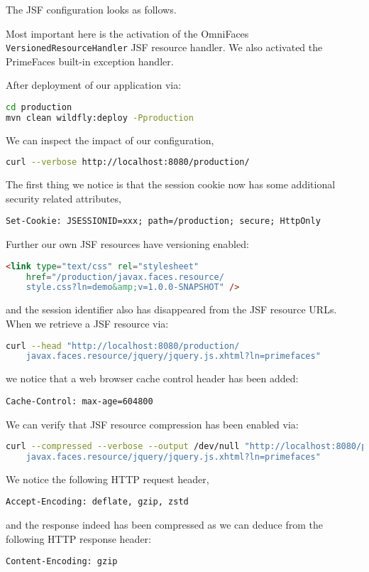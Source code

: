 The JSF configuration looks as follows.

Most important here is the activation of the OmniFaces \texttt{VersionedResourceHandler} JSF resource handler.
We also activated the PrimeFaces built-in exception handler.

After deployment of our application via:
\begin{lstlisting}[language=bash]
cd production
mvn clean wildfly:deploy -Pproduction
\end{lstlisting}
We can inspect the impact of our configuration,
\begin{lstlisting}[language=bash]
curl --verbose http://localhost:8080/production/
\end{lstlisting}
The first thing we notice is that the session cookie now has some additional security related attributes,
\begin{lstlisting}
Set-Cookie: JSESSIONID=xxx; path=/production; secure; HttpOnly
\end{lstlisting}
Further our own JSF resources have versioning enabled:
\begin{lstlisting}[language=html]
<link type="text/css" rel="stylesheet"
	href="/production/javax.faces.resource/
	style.css?ln=demo&amp;v=1.0.0-SNAPSHOT" />
\end{lstlisting}
and the session identifier also has disappeared from the JSF resource URLs.
When we retrieve a JSF resource via:
\begin{lstlisting}[language=bash]
curl --head "http://localhost:8080/production/
	javax.faces.resource/jquery/jquery.js.xhtml?ln=primefaces"
\end{lstlisting}
we notice that a web browser cache control header has been added:
\begin{lstlisting}
Cache-Control: max-age=604800
\end{lstlisting}
We can verify that JSF resource compression has been enabled via:
\begin{lstlisting}[language=bash]
curl --compressed --verbose --output /dev/null "http://localhost:8080/production/
	javax.faces.resource/jquery/jquery.js.xhtml?ln=primefaces"
\end{lstlisting}
We notice the following HTTP request header,
\begin{lstlisting}
Accept-Encoding: deflate, gzip, zstd
\end{lstlisting}
and the response indeed has been compressed as we can deduce from the following HTTP response header:
\begin{lstlisting}
Content-Encoding: gzip
\end{lstlisting}

